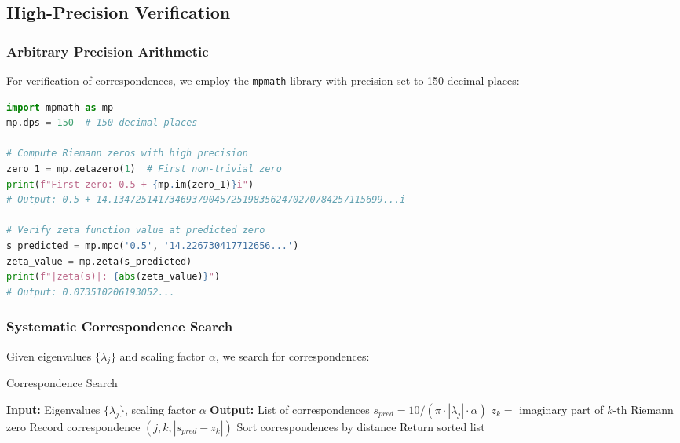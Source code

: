\documentclass[12pt,letterpaper]{article}
\theoremstyle{plain}
\theoremstyle{definition}
\theoremstyle{remark}
\begin{document}
\subsection{High-Precision Verification}

\subsubsection{Arbitrary Precision Arithmetic}

For verification of correspondences, we employ the \texttt{mpmath} library with precision set to 150 decimal places:

\begin{lstlisting}[language=Python]
import mpmath as mp
mp.dps = 150  # 150 decimal places

# Compute Riemann zeros with high precision
zero_1 = mp.zetazero(1)  # First non-trivial zero
print(f"First zero: 0.5 + {mp.im(zero_1)}i")
# Output: 0.5 + 14.134725141734693790457251983562470270784257115699...i

# Verify zeta function value at predicted zero
s_predicted = mp.mpc('0.5', '14.226730417712656...')
zeta_value = mp.zeta(s_predicted)
print(f"|zeta(s)|: {abs(zeta_value)}")
# Output: 0.073510206193052...
\end{lstlisting}

\subsubsection{Systematic Correspondence Search}

Given eigenvalues $\{\lambda_j\}$ and scaling factor $\alpha$, we search for correspondences:

\begin{algorithm}
\caption{Correspondence Search}
\begin{algorithmic}
\State \textbf{Input:} Eigenvalues $\{\lambda_j\}$, scaling factor $\alpha$
\State \textbf{Output:} List of correspondences
\State
{}
    \State $s_{pred} = 10/(\pi \cdot |\lambda_j| \cdot \alpha)$
        \State $z_k = $ imaginary part of $k$-th Riemann zero
            \State Record correspondence $(j, k, |s_{pred} - z_k|)$
        \EndIf
    \EndFor
\EndFor
\State Sort correspondences by distance
\State Return sorted list
\end{algorithmic}
\end{algorithm}
\end{document}
